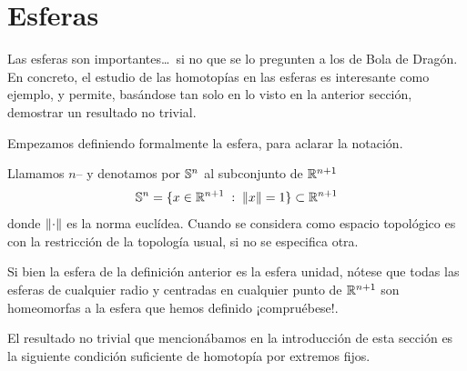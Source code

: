 \section{Esferas}
Las esferas son importantes\dots\ si no que se lo pregunten a los de Bola de Dragón. En concreto, el estudio de las homotopías en las esferas es interesante como ejemplo, y permite, basándose tan solo en lo visto en la anterior sección, demostrar un resultado no trivial.

Empezamos definiendo formalmente la esfera, para aclarar la notación.

\begin{defi}[Esfera]
	Llamamos $n$-- y denotamos por $\mathbb{S}^n$ al subconjunto de $\mathbb{R}^{n+1}$
	\[\mathbb{S}^n = \{x\in\mathbb{R}^{n+1}\;:\; \lVert x\rVert=1\}\subset\mathbb{R}^{n+1}\]
	donde $\lVert\cdot\rVert$ es la norma euclídea. Cuando se considera como espacio topológico es con la restricción de la topología usual, si no se especifica otra.
\end{defi}

\begin{obs}
	Si bien la esfera de la definición anterior es la esfera unidad, nótese que todas las esferas de cualquier radio y centradas en cualquier punto de $\mathbb{R}^{n+1}$ son homeomorfas a la esfera que hemos definido ¡compruébese!.
\end{obs}

El resultado no trivial que mencionábamos en la introducción de esta sección es la siguiente condición suficiente de homotopía por extremos fijos.

